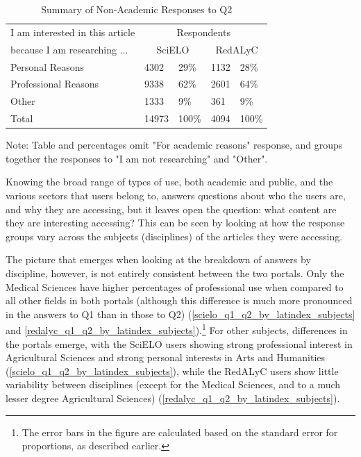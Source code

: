 \begin{table}[!htbp]
\centering
\caption{Summary of Non-Academic Responses to Q2} \label{q2_nonacademic_summary}
\begin{threeparttable}
\begin{tabular}{@{}lllll@{}}
\toprule
I am interested in this article     &\multicolumn{4}{c}{Respondents} \\ \cmidrule{2-4}
because I am researching ...    &   \multicolumn{2}{c}{SciELO}  &   \multicolumn{2}{c}{RedALyC} \\ \midrule
Personal Reasons    &   4302    &   29\%    &   1132    &   28\%    \\
Professional Reasons    &   9338    &   62\%    &   2601    &   64\%    \\
Other   &   1333    &   9\% &   361 &   9\% \\ \midrule
Total   &   14973   &   100\%   &   4094    &   100\%   \\ \bottomrule
\end{tabular}
\begin{tablenotes}
\small
\item Note: Table and percentages omit "For academic reasons" response, and groups together the responses to "I am not researching" and "Other".
\end{tablenotes}
\end{threeparttable}
\end{table}



Knowing the broad range of types of use, both academic and public, and the various sectors that users belong to, answers questions about who the users are, and why they are accessing, but it leaves open the question: what content are they are interesting accessing? This can be seen by looking at how the response groups vary across the subjects (disciplines) of the articles they were accessing.

The picture that emerges when looking at the breakdown of answers by discipline, however, is not entirely consistent between the two portals. Only the Medical Sciences have higher percentages of professional use when compared to all other fields in both portals (although this difference is much more pronounced in the answers to Q1 than in those to Q2) (\autoref{scielo_q1_q2_by_latindex_subjects} and \autoref{redalyc_q1_q2_by_latindex_subjects}).\footnote{The error bars in the figure are calculated based on the standard error for proportions, as described earlier.} For other subjects, differences in the portals emerge, with the SciELO users showing strong professional interest in Agricultural Sciences and strong personal interests in Arts and Humanities (\autoref{scielo_q1_q2_by_latindex_subjects}), while the RedALyC users show little variability between disciplines (except for the Medical Sciences, and to a much lesser degree Agricultural Sciences) (\autoref{redalyc_q1_q2_by_latindex_subjects}).

